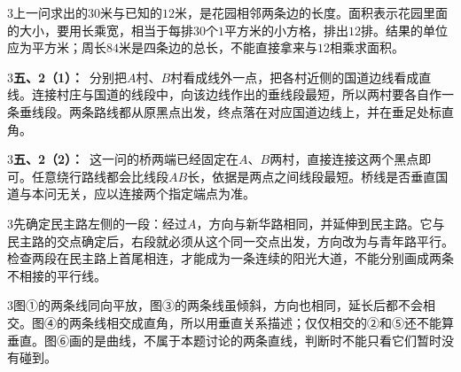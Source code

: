 \documentclass[multi=snippet,border={5bp 20bp 5bp 5bp}]{standalone}
\newenvironment{snippet}[3]{\begin{minipage}{#1bp}\color{answerred}\fontsize{#2}{#3}\selectfont\raggedright}{\end{minipage}}
\begin{document}
\begin{snippet}{505}{11.5}{14}\begin{multicols}{3}\raggedcolumns 上一问求出的\(30\)\allowbreak 米与已知的\(12\)\allowbreak 米，是花园相邻两条边的长度。面积表示花园里面的大小，要用长乘宽，相当于每排\(30\)\allowbreak 个\(1\)\allowbreak 平方米的小方格，排出\(12\)\allowbreak 排。结果的单位应为平方米；周长\(84\)\allowbreak 米是四条边的总长，不能直接拿来与\(12\)\allowbreak 相乘求面积。\end{multicols}\end{snippet}
\begin{snippet}{505}{11.5}{14}\begin{multicols}{3}\raggedcolumns \textbf{五、2（1）：}\ 分别把\(A\)\allowbreak 村、\(B\)\allowbreak 村看成线外一点，把各村近侧的国道边线看成直线。连接村庄与国道的线段中，向该边线作出的垂线段最短，所以两村要各自作一条垂线段。两条路线都从原黑点出发，终点落在对应国道边线上，并在垂足处标直角。\end{multicols}\end{snippet}
\begin{snippet}{505}{11.5}{14}\begin{multicols}{3}\raggedcolumns \textbf{五、2（2）：}\ 这一问的桥两端已经固定在\(A\)\allowbreak 、\(B\)\allowbreak 两村，直接连接这两个黑点即可。任意绕行路线都会比线段\(AB\)\allowbreak 长，依据是两点之间线段最短。桥线是否垂直国道与本问无关，应以连接两个指定端点为准。\end{multicols}\end{snippet}
\begin{snippet}{505}{11.5}{14}\begin{multicols}{3}\raggedcolumns 先确定民主路左侧的一段：经过\(A\)\allowbreak ，方向与新华路相同，并延伸到民主路。它与民主路的交点确定后，右段就必须从这个同一交点出发，方向改为与青年路平行。检查两段在民主路上首尾相连，才能成为一条连续的阳光大道，不能分别画成两条不相接的平行线。\end{multicols}\end{snippet}
\begin{snippet}{505}{11.5}{14}\begin{multicols}{3}\raggedcolumns 图①的两条线同向平放，图③的两条线虽倾斜，方向也相同，延长后都不会相交。图④的两条线相交成直角，所以用垂直关系描述；仅仅相交的②和⑤还不能算垂直。图⑥画的是曲线，不属于本题讨论的两条直线，判断时不能只看它们暂时没有碰到。\end{multicols}\end{snippet}
\end{document}
